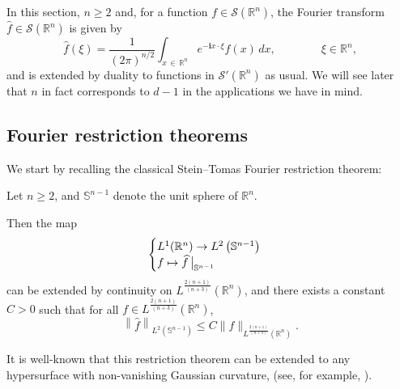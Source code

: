 \documentclass[AHL,Unicode,longabstracts]{cedram}
\newcommand{\scS}{\mathscr{S}}
\newcommand*\R{\mathbb{R}}
\renewcommand*\S{\mathbb{S}}
\renewcommand{\i}{\mathbf{i}}
\renewcommand{\geq}{\geqslant}
\renewcommand{\hat}{\widehat}
\let\oldhat\hat
\renewcommand*{\hat}[1]{\mathchoice{\widehat{#1}}{\widehat{#1}}{\oldhat{#1}}{\oldhat{#1}}}
\begin{document}
In this section, $n \geq 2$ and, for a function $f \in \scS(\R^n)$, the Fourier transform $\widehat f \in \scS(\R^n)$ is given by
\begin{equation*}
\widehat f(\xi) = \frac{1}{(2\pi)^{n/2}} \int_{x\, \in\,\R^n} e^{- \i x \cdot \xi} f(x) \, dx, \qquad \qquad\xi \in \R^n,
\end{equation*}
and is extended by duality to functions in $\scS'(\R^n)$ as usual. We will see later that $n$ in fact corresponds to $d-1$ in the applications we have in mind.

\subsection{Fourier restriction theorems}

We start by recalling the classical Stein--Tomas Fourier restriction theorem:
\begin{theo}
\label{Thm-Stein-Tomas}
Let $n\geqslant 2$, and $\S^{n-1}$ denote the unit sphere of $\R^n$.

Then the map
\begin{equation*}
\begin{cases}
L^1(\R^n) \to L^2\left(\S^{n-1}\right)
\\
f \mapsto \hat f\, \big|_{\S^{n-1}}
\end{cases}
\end{equation*}
can be extended by continuity on $L^{\frac{2(n+1)}{(n+3)}}(\R^n)$, and there exists a constant $C>0$ such that for all $f \in L^{\frac{2(n+1)}{(n+3)}}(\R^n)$,
\begin{equation*}
\left\| \widehat f \right\|_{L^2\left(\S^{n-1}\right)} \leqslant C \|f\|_{L^{\frac{2(n+1)}{(n+3)}}\left(\R^n\right)}.
\end{equation*}
\end{theo}

It is well-known that this restriction theorem can be extended to any hypersurface with non-vanishing Gaussian curvature, (see, for example, \cite[Corollary~2.2.2]{sogge2017fourier}).
\end{document}
